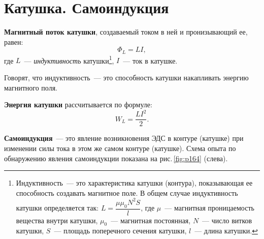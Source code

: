 \documentclass[main.tex]{subfiles}
\begin{document}

\pagestyle{empty}

 

\setcounter{section}{41
}
\addtocounter{section}{-1} 

\section{Катушка. Самоиндукция}



\textbf{Магнитный поток катушки}, создаваемый током в ней и пронизывающий ее, равен:
\begin{equation}
    \Phi_L=LI,
\end{equation}
где $L$~--- \emph{индуктивность} катушки\footnote{Индуктивность~--- это характеристика катушки (контура), показывающая ее способность создавать магнитное поле. В общем случае индуктивность катушки определяется так: $L=\dfrac{\mu\mu_0N^2S}{l}$, где $\mu$~--- магнитная проницаемость вещества внутри катушки, $\mu_0$~--- магнитная постоянная, $N$~--- число витков катушки, $S$~--- площадь поперечного сечения катушки, $l$~--- длина катушки.}, $I$~--- ток в катушке.



Говорят, что индуктивность~--- это способность катушки накапливать энергию магнитного поля.

\textbf{Энергия катушки} рассчитывается по формуле:
\begin{equation}
    W_L=\frac{LI^2}{2}.
\end{equation}

\textbf{Самоиндукция}~--- это явление возникновения ЭДС в контуре (катушке) при изменении силы тока в этом же самом контуре (катушке). Схема опыта по обнаружению явления самоиндукции показана на рис.\,\ref{fig:p164} (слева).
\end{document}
